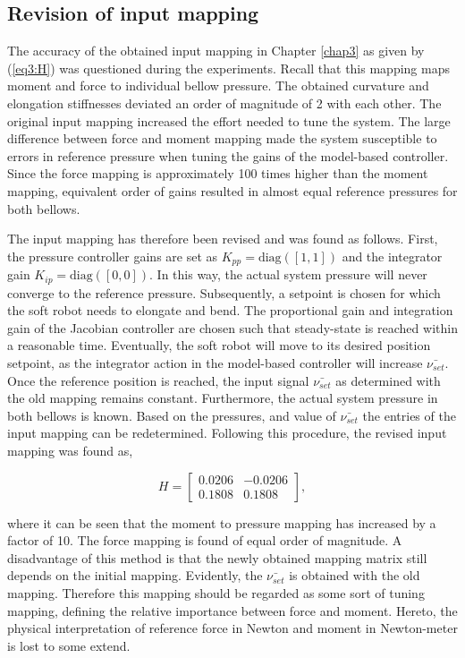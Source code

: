 \subsection*{Revision of input mapping}

The accuracy of the obtained input mapping in Chapter \ref{chap3} as given by (\ref{eq3:H}) was questioned during the experiments. Recall that this mapping maps moment and force to individual bellow pressure. The obtained curvature and elongation stiffnesses deviated an order of magnitude of 2 with each other. The original input mapping increased the effort needed to tune the system. The large difference between force and moment mapping made the system susceptible to errors in reference pressure when tuning the gains of the model-based controller. Since the force mapping is approximately 100 times higher than the moment mapping, equivalent order of gains resulted in almost equal reference pressures for both bellows.

The input mapping has therefore been revised and was found as follows. First, the pressure controller gains are set as $K_{pp} =\text{diag}([1,1])$ and the integrator gain $K_{ip} = \text{diag}([0,0])$. In this way, the actual system pressure will never converge to the reference pressure. Subsequently, a setpoint is chosen for which the soft robot needs to elongate and bend. The proportional gain and integration gain of the Jacobian controller are chosen such that steady-state is reached within a reasonable time. Eventually, the soft robot will move to its desired position setpoint, as the integrator action in the model-based controller will increase $\bar{\nu_{set}}$. Once the reference position is reached, the input signal $\bar{\nu_{set}}$ as determined with the old mapping remains constant. Furthermore, the actual system pressure in both bellows is known. Based on the pressures, and value of $\bar{\nu_{set}}$ the entries of the input mapping can be redetermined. Following this procedure, the revised input mapping was found as,

\begin{equation}
    H = \begin{bmatrix} 	0.0206 &  -0.0206 \\ 
	0.1808 & 0.1808 \end{bmatrix},
    \label{eq4:revisedH}
\end{equation}

where it can be seen that the moment to pressure mapping has increased by a factor of 10. The force mapping is found of equal order of magnitude. A disadvantage of this method is that the newly obtained mapping matrix still depends on the initial mapping. Evidently, the $\bar{\nu_{set}}$ is obtained with the old mapping. Therefore this mapping should be regarded as some sort of tuning mapping, defining the relative importance between force and moment. Hereto, the physical interpretation of reference force in Newton and moment in Newton-meter is lost to some extend. 

